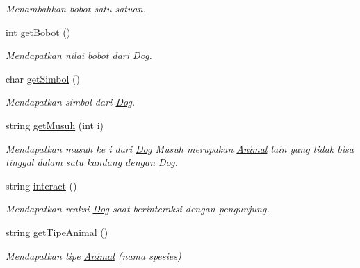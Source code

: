 \begin{DoxyCompactItemize}
\begin{DoxyCompactList}\small\item\em Menambahkan bobot satu satuan. \end{DoxyCompactList}\item 
int \hyperlink{classDog_ac115925dae59dd1640161c1a5b163bea}{get\-Bobot} ()
\begin{DoxyCompactList}\small\item\em Mendapatkan nilai bobot dari \hyperlink{classDog}{Dog}. \end{DoxyCompactList}\item 
char \hyperlink{classDog_a20ea4c8b525fe4610f614f4259029eaa}{get\-Simbol} ()
\begin{DoxyCompactList}\small\item\em Mendapatkan simbol dari \hyperlink{classDog}{Dog}. \end{DoxyCompactList}\item 
string \hyperlink{classDog_a0b476b766a08a8d43ee40ab96a4425ad}{get\-Musuh} (int i)
\begin{DoxyCompactList}\small\item\em Mendapatkan musuh ke i dari \hyperlink{classDog}{Dog} Musuh merupakan \hyperlink{classAnimal}{Animal} lain yang tidak bisa tinggal dalam satu kandang dengan \hyperlink{classDog}{Dog}. \end{DoxyCompactList}\item 
string \hyperlink{classDog_ae281395a2d8329b6abe3a2bc2c26bf5b}{interact} ()
\begin{DoxyCompactList}\small\item\em Mendapatkan reaksi \hyperlink{classDog}{Dog} saat berinteraksi dengan pengunjung. \end{DoxyCompactList}\item 
string \hyperlink{classDog_a3bc9048629f101f1aa7da5708ff1ef9a}{get\-Tipe\-Animal} ()
\begin{DoxyCompactList}\small\item\em Mendapatkan tipe \hyperlink{classAnimal}{Animal} (nama spesies) \end{DoxyCompactList}\end{DoxyCompactItemize}
